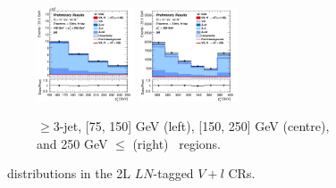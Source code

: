 \begin{figure}[h!]
\begin{subfigure}[b]{\textwidth}
        \includegraphics[width=0.32\textwidth]{Images/VH/Own_fit/postfit_VHcc/Region_distpTV_BMax250_BMin150_DSR_J3_TTypeln_incJet1_T1_L2_Y6051_GlobalFit_conditionnal_mu1.png}
        \includegraphics[width=0.32\textwidth]{Images/VH/Own_fit/postfit_VHcc/Region_distpTV_BMin250_DSR_J3_TTypeln_incJet1_T1_L2_Y6051_GlobalFit_conditionnal_mu1.png}
        \caption{$\geq$3-jet, [75, 150] GeV (left), [150, 250] GeV (centre), and 250  GeV $\leq$ (right) \ptv\ regions.}
        \label{fig:plots_VHcc_2L_LN_3J}
    \end{subfigure}
    \caption{\ptv\ distributions in the 2L $LN$-tagged $V+l$ CRs.}
    \label{fig:plots_VHcc_2L_LN}
\end{figure}

